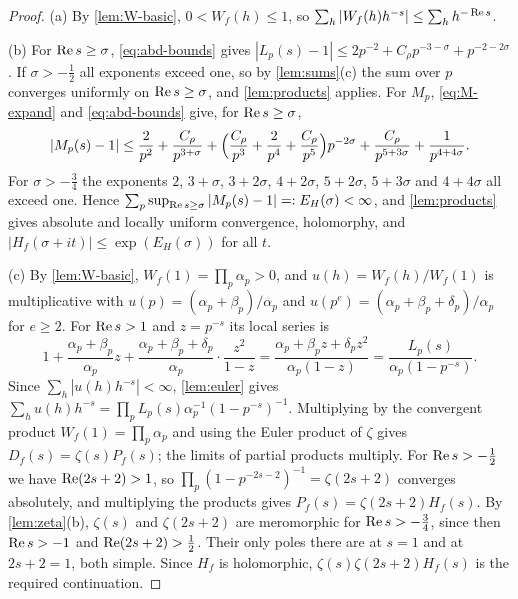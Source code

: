 \begin{proof}
(a) By \cref{lem:W-basic}, $0<W_f(h)\le1$, so $\sum_h|W_f(h)h^{-s}|\le\sum_hh^{-\operatorname{Re} s}$.

(b) For $\operatorname{Re} s\ge\sigma$, \eqref{eq:abd-bounds} gives $|L_p(s)-1|\le2p^{-2}+C_\rho p^{-3-\sigma}+p^{-2-2\sigma}$. If $\sigma>-\frac12$ all exponents exceed one, so by \cref{lem:sums}(c) the sum over $p$ converges uniformly on $\operatorname{Re} s\ge\sigma$, and \cref{lem:products} applies. For $M_p$, \eqref{eq:M-expand} and \eqref{eq:abd-bounds} give, for $\operatorname{Re} s\ge\sigma$,
\[
|M_p(s)-1|\le\frac2{p^2}+\frac{C_\rho}{p^{3+\sigma}}+\Bigl(\frac{C_\rho}{p^3}+\frac2{p^4}+\frac{C_\rho}{p^5}\Bigr)p^{-2\sigma}+\frac{C_\rho}{p^{5+3\sigma}}+\frac1{p^{4+4\sigma}}.
\]
For $\sigma>-\frac34$ the exponents $2$, $3+\sigma$, $3+2\sigma$, $4+2\sigma$, $5+2\sigma$, $5+3\sigma$ and $4+4\sigma$ all exceed one. Hence $\sum_p\sup_{\operatorname{Re} s\ge\sigma}|M_p(s)-1|=:E_H(\sigma)<\infty$, and \cref{lem:products} gives absolute and locally uniform convergence, holomorphy, and $|H_f(\sigma+it)|\le\exp(E_H(\sigma))$ for all $t$.

(c) By \cref{lem:W-basic}, $W_f(1)=\prod_p\alpha_p>0$, and $u(h)=W_f(h)/W_f(1)$ is multiplicative with $u(p)=(\alpha_p+\beta_p)/\alpha_p$ and $u(p^e)=(\alpha_p+\beta_p+\delta_p)/\alpha_p$ for $e\ge2$. For $\operatorname{Re} s>1$ and $z=p^{-s}$ its local series is
\[
1+\frac{\alpha_p+\beta_p}{\alpha_p}z+\frac{\alpha_p+\beta_p+\delta_p}{\alpha_p}\cdot\frac{z^2}{1-z}=\frac{\alpha_p+\beta_pz+\delta_pz^2}{\alpha_p(1-z)}=\frac{L_p(s)}{\alpha_p(1-p^{-s})}.
\]
Since $\sum_h|u(h)h^{-s}|<\infty$, \cref{lem:euler} gives $\sum_hu(h)h^{-s}=\prod_pL_p(s)\alpha_p^{-1}(1-p^{-s})^{-1}$. Multiplying by the convergent product $W_f(1)=\prod_p\alpha_p$ and using the Euler product of $\zeta$ gives $D_f(s)=\zeta(s)P_f(s)$; the limits of partial products multiply. For $\operatorname{Re} s>-\frac12$ we have $\operatorname{Re}(2s+2)>1$, so $\prod_p(1-p^{-2s-2})^{-1}=\zeta(2s+2)$ converges absolutely, and multiplying the products gives $P_f(s)=\zeta(2s+2)H_f(s)$. By \cref{lem:zeta}(b), $\zeta(s)$ and $\zeta(2s+2)$ are meromorphic for $\operatorname{Re} s>-\frac34$, since then $\operatorname{Re} s>-1$ and $\operatorname{Re}(2s+2)>\frac12$. Their only poles there are at $s=1$ and at $2s+2=1$, both simple. Since $H_f$ is holomorphic, $\zeta(s)\zeta(2s+2)H_f(s)$ is the required continuation.


\end{proof}
